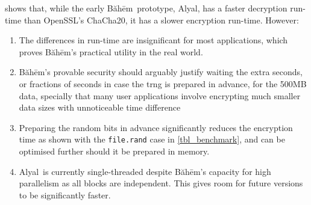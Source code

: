\documentclass[twocolumn,hidelinks]{article}
\newcommand{\baheem}{Băhēm}
\newcommand{\alyal}{Alyal}
\begin{document}
 shows that, while the early \baheem\ prototype,
\alyal, has a faster decryption run-time than OpenSSL's ChaCha20, it has
a slower encryption run-time. However:
\begin{enumerate}
    \item The differences in run-time are insignificant for most
        applications, which proves \baheem's practical utility in the real
        world.
    \item \baheem's provable security should arguably justify waiting the
        extra seconds, or fractions of seconds in case the \gls{trng} is
        prepared in advance, for the 500MB data, specially that many user
        applications involve encrypting much smaller data sizes with
        unnoticeable time difference
    \item Preparing the random bits in advance significantly reduces the
        encryption time as shown with the \texttt{file.rand} case in
        \cref{tbl_benchmark}, and can be optimised further should it be
        prepared in memory.
    \item \alyal\ is currently single-threaded despite \baheem's capacity
        for high parallelism as all blocks are independent. This gives room
        for future versions to be significantly faster.
\end{enumerate}
\end{document}
